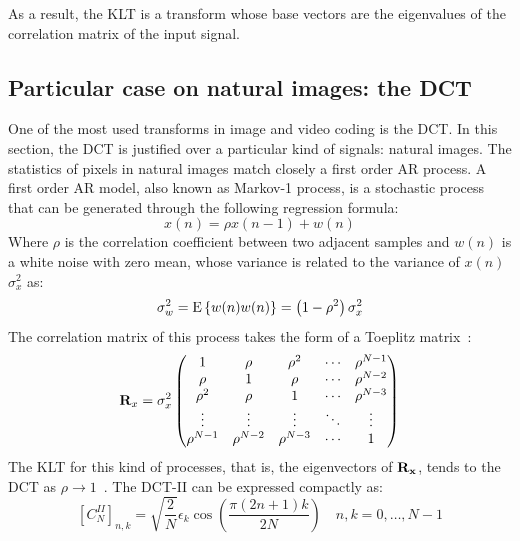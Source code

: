 \documentclass[11pt,a4paper,openright,twoside]{book}
\numberwithin{equation}{section} %
\numberwithin{figure}{section} %
\numberwithin{table}{section} %
\begin{document}
As a result, the \ac{KLT} is a transform whose base vectors are the
eigenvalues of the correlation matrix of the input signal.

\subsection{Particular case on natural images: the \acs{DCT}}
\label{sub:particular_case_dct}

One of the most used transforms in image and video coding is the
\acf{DCT}.
In this section, the \ac{DCT} is justified over a particular kind
of signals: natural images.
The statistics of pixels in natural images match closely a first order
\ac{AR} process.
A first order \ac{AR} model, also known as Markov-1 process, is a stochastic
process that can be generated through the following regression formula:
\begin{equation}
	x(n) = \rho x(n-1) + w(n)
	\label{eqn:first_order_ar_model}
\end{equation}
Where $\rho$ is the correlation coefficient between two adjacent samples
and $w(n)$ is a white noise with zero mean, whose variance is related to
the variance of $x(n)$ $\sigma_x^2$ as:
\begin{equation}
	\sigma_w^2 = \text{E}\left\{ w(n) w(n) \right\} =
	\left(1-\rho^2\right)\sigma_x^2
\end{equation}
The correlation matrix of this process takes the form of a Toeplitz
matrix~\cite{akansu-12-toeplitz-approximation}:
\begin{equation}
	\mathbf{R}_x = \sigma_x^2
	\begin{pmatrix}
		1          & \rho       & \rho^2     & \cdots & \rho^{N-1} \\
		\rho       & 1          & \rho       & \cdots & \rho^{N-2} \\
		\rho^2     & \rho       & 1          & \cdots & \rho^{N-3} \\
		\vdots     & \vdots     & \vdots     & \ddots & \vdots     \\
		\rho^{N-1} & \rho^{N-2} & \rho^{N-3} & \cdots & 1
	\end{pmatrix}
	\label{eqn:toeplitz_matrix}
\end{equation}
The \ac{KLT} for this kind of processes, that is, the eigenvectors of
$\mathbf{R}_{\mathbf{x}}$, tends to the \ac{DCT} as $\rho\to1$~\cite{britanak-06-dct-and-dst}.
The \ac{DCT}-II can be expressed compactly as:
\begin{equation}
	{\left[C_{N}^{II} \right]}_{n,k} =
	\sqrt{\frac{2}{N}}\epsilon_k\cos\left(\frac{\pi(2n+1)k}{2N}\right)
	\quad
	n,k=0,\dots,N-1
	\label{eqn:dct_ii}
\end{equation}
\end{document}
